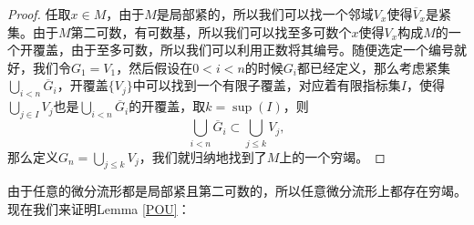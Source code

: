 \begin{proof}
任取$x\in M$，由于$M$是局部紧的，所以我们可以找一个邻域$V_x$使得$\overline{V}_x$是紧集。由于$M$第二可数，有可数基，所以我们可以找至多可数个$x$使得$V_x$构成$M$的一个开覆盖，由于至多可数，所以我们可以利用正数将其编号。随便选定一个编号就好，我们令$G_1=V_1$，然后假设在$0<i<n$的时候$G_i$都已经定义，那么考虑紧集$\bigcup_{i<n}\overline{G}_i$，开覆盖$\{V_j\}$中可以找到一个有限子覆盖，对应着有限指标集$I$，使得$\bigcup_{j\in I}V_j$也是$\bigcup_{i<n}\overline{G}_i$的开覆盖，取$k=\sup(I)$，则
\[
	\bigcup_{i<n}\overline{G}_i\subset \bigcup_{j\leq k}V_j,
\]
那么定义$G_n=\bigcup_{j\leq k}V_j$，我们就归纳地找到了$M$上的一个穷竭。
\end{proof}

由于任意的微分流形都是局部紧且第二可数的，所以任意微分流形上都存在穷竭。现在我们来证明Lemma \ref{POU}：

